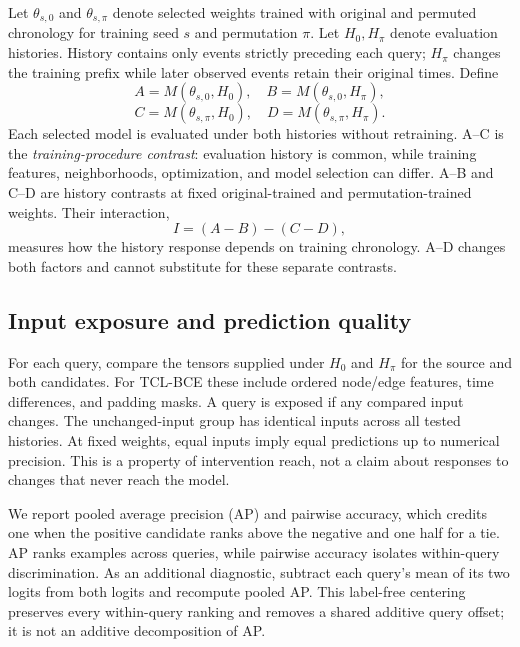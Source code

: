 \documentclass[sigconf,anonymous,review]{acmart}
\begin{document}
Let $\theta_{s,0}$ and $\theta_{s,\pi}$ denote selected weights trained with original and permuted chronology for training seed $s$ and permutation $\pi$. Let $H_0,H_\pi$ denote evaluation histories. History contains only events strictly preceding each query; $H_\pi$ changes the training prefix while later observed events retain their original times. Define
\[
 A=M(\theta_{s,0},H_0),\quad B=M(\theta_{s,0},H_\pi),
\]
\[
 C=M(\theta_{s,\pi},H_0),\quad D=M(\theta_{s,\pi},H_\pi).
\]
Each selected model is evaluated under both histories without retraining. A--C is the \emph{training-procedure contrast}: evaluation history is common, while training features, neighborhoods, optimization, and model selection can differ. A--B and C--D are history contrasts at fixed original-trained and permutation-trained weights. Their interaction,
\begin{equation}
 I=(A-B)-(C-D),
\end{equation}
measures how the history response depends on training chronology. A--D changes both factors and cannot substitute for these separate contrasts.

\begin{table}[t]
\centering\small
\caption{Crossed MOOC diagnostic. A--D are pairwise accuracies (\%); contrasts are percentage points. TCL-BCE rows average five permutations within each of six seeds, then average seeds. DyGFormer rows report the two seeds separately, each averaging five permutations. ON/OFF refers to explicit time encoding during training and inference. AP, centered AP, individual permutations, and seed-level intervals are in the artifact.}
\label{tab:crossed}

\end{table}

\subsection{Input exposure and prediction quality}
For each query, compare the tensors supplied under $H_0$ and $H_\pi$ for the source and both candidates. For TCL-BCE these include ordered node/edge features, time differences, and padding masks. A query is exposed if any compared input changes. The unchanged-input group has identical inputs across all tested histories. At fixed weights, equal inputs imply equal predictions up to numerical precision. This is a property of intervention reach, not a claim about responses to changes that never reach the model.

We report pooled average precision (AP) and pairwise accuracy, which credits one when the positive candidate ranks above the negative and one half for a tie. AP ranks examples across queries, while pairwise accuracy isolates within-query discrimination. As an additional diagnostic, subtract each query's mean of its two logits from both logits and recompute pooled AP. This label-free centering preserves every within-query ranking and removes a shared additive query offset; it is not an additive decomposition of AP.
\end{document}
